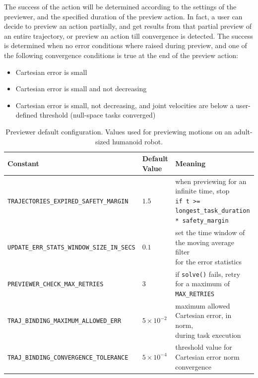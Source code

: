 The success of the action will be determined according to the settings of the previewer, and the specified duration of the preview action. In fact, a user can decide to preview an action partially, and get results from that partial preview of an entire trajectory, or preview an action till convergence is detected. The success is determined when no error conditions where raised during preview, and one of the following convergence conditions is true at the end of the preview action:
\begin{itemize}
\item Cartesian error is small
\item Cartesian error is small and not decreasing
\item Cartesian error is small, not decreasing, and joint velocities are below a user-defined threshold (null-space tasks converged) 
\end{itemize}

\begin{table}[hbt]
   \small
   \begin{center}
   \begin{tabular}{| >{\centering\arraybackslash}m{2.3in} | >{\centering\arraybackslash}m{0.5in} | >{\centering\arraybackslash}m{3in} |}
   \hline
   \textbf{Constant} & \textbf{Default Value} & \textbf{Meaning} \\\hline
   \cline{1-3}
   \footnotesize{\texttt{TRAJECTORIES\_EXPIRED\_SAFETY\_MARGIN}}           & $1.5$   & \shortstack{when previewing for an infinite time, stop \\ \footnotesize{\texttt{if t >= longest\_task\_duration * safety\_margin}}} \\\hline
   \footnotesize{\texttt{UPDATE\_ERR\_STATS\_WINDOW\_SIZE\_IN\_SECS}} & $0.1$    & \shortstack{set the time window of the moving average filter \\ for the error statistics} \\\hline
   \footnotesize{\texttt{PREVIEWER\_CHECK\_MAX\_RETRIES}}                  & $3$     & if \texttt{solve()} fails, retry for a maximum of \footnotesize{\texttt{MAX\_RETRIES}} \\\hline
   \footnotesize{\texttt{TRAJ\_BINDING\_MAXIMUM\_ALLOWED\_ERR}}           & $5\times10^{-2}$  & \shortstack{maximum allowed Cartesian error, in norm, \\ during task execution} \\\hline
   \footnotesize{\texttt{TRAJ\_BINDING\_CONVERGENCE\_TOLERANCE}}           & $5\times10^{-4}$  & threshold value for Cartesian error norm convergence \\\hline
   \end{tabular}
   \end{center}
   \caption{Previewer default configuration. Values used for previewing motions on an adult-sized humanoid robot.}
   \label{table:previewer_constants}
\end{table}

